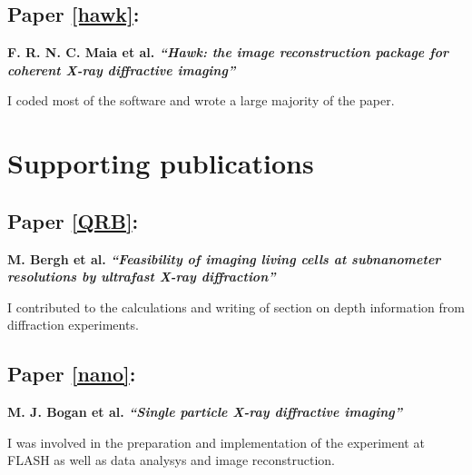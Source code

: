\clearpage

\subsection*{Paper \ref{hawk}:}{\bf F. R. N. C. Maia et al. {\em ``Hawk: the image reconstruction package for coherent X-ray diffractive
      imaging''}}

\noindent I coded most of the software and wrote a large majority of the paper.

\section*{Supporting publications}

\vspace{1cm}

\subsection*{Paper \ref{QRB}:}{\bf M. Bergh et al. {\em ``Feasibility of imaging living cells at subnanometer resolutions by ultrafast X-ray diffraction'' }}

\noindent I contributed to the calculations and writing of section on depth information from diffraction
experiments.
\subsection*{Paper \ref{nano}:}{\bf M. J. Bogan et al. {\em ``Single particle X-ray diffractive imaging''}}

\noindent I was involved in the preparation and implementation of the experiment
at FLASH as well as data analysys and image reconstruction.

